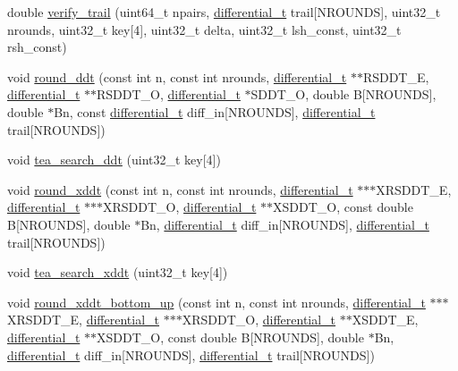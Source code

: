 \begin{DoxyCompactItemize}
\item 
double \hyperlink{tea-add-ddt-search_8cc_ac37bdb6b6b92aab26ba068877b6591e4}{verify\-\_\-trail} (uint64\-\_\-t npairs, \hyperlink{structdifferential__t}{differential\-\_\-t} trail\mbox{[}\-N\-R\-O\-U\-N\-D\-S\mbox{]}, uint32\-\_\-t nrounds, uint32\-\_\-t key\mbox{[}4\mbox{]}, uint32\-\_\-t delta, uint32\-\_\-t lsh\-\_\-const, uint32\-\_\-t rsh\-\_\-const)
\item 
void \hyperlink{tea-add-ddt-search_8cc_a06a1cdac8a817642490ecdb7371de378}{round\-\_\-ddt} (const int n, const int nrounds, \hyperlink{structdifferential__t}{differential\-\_\-t} $\ast$$\ast$\-R\-S\-D\-D\-T\-\_\-\-E, \hyperlink{structdifferential__t}{differential\-\_\-t} $\ast$$\ast$\-R\-S\-D\-D\-T\-\_\-\-O, \hyperlink{structdifferential__t}{differential\-\_\-t} $\ast$\-S\-D\-D\-T\-\_\-\-O, double \-B\mbox{[}\-N\-R\-O\-U\-N\-D\-S\mbox{]}, double $\ast$\-Bn, const \hyperlink{structdifferential__t}{differential\-\_\-t} diff\-\_\-in\mbox{[}\-N\-R\-O\-U\-N\-D\-S\mbox{]}, \hyperlink{structdifferential__t}{differential\-\_\-t} trail\mbox{[}\-N\-R\-O\-U\-N\-D\-S\mbox{]})
\item 
void \hyperlink{tea-add-ddt-search_8cc_a5519276063a08ee4fc0d2f580899b9c9}{tea\-\_\-search\-\_\-ddt} (uint32\-\_\-t key\mbox{[}4\mbox{]})
\item 
void \hyperlink{tea-add-ddt-search_8cc_a6421afe69f9ebf929f3f33acb75fd680}{round\-\_\-xddt} (const int n, const int nrounds, \hyperlink{structdifferential__t}{differential\-\_\-t} $\ast$$\ast$$\ast$\-X\-R\-S\-D\-D\-T\-\_\-\-E, \hyperlink{structdifferential__t}{differential\-\_\-t} $\ast$$\ast$$\ast$\-X\-R\-S\-D\-D\-T\-\_\-\-O, \hyperlink{structdifferential__t}{differential\-\_\-t} $\ast$$\ast$\-X\-S\-D\-D\-T\-\_\-\-O, const double \-B\mbox{[}\-N\-R\-O\-U\-N\-D\-S\mbox{]}, double $\ast$\-Bn, \hyperlink{structdifferential__t}{differential\-\_\-t} diff\-\_\-in\mbox{[}\-N\-R\-O\-U\-N\-D\-S\mbox{]}, \hyperlink{structdifferential__t}{differential\-\_\-t} trail\mbox{[}\-N\-R\-O\-U\-N\-D\-S\mbox{]})
\item 
void \hyperlink{tea-add-ddt-search_8cc_adeb95c6bad2674864ec015054f307247}{tea\-\_\-search\-\_\-xddt} (uint32\-\_\-t key\mbox{[}4\mbox{]})
\item 
void \hyperlink{tea-add-ddt-search_8cc_ae2fedba8b096ccade5bd0e53baa5a14a}{round\-\_\-xddt\-\_\-bottom\-\_\-up} (const int n, const int nrounds, \hyperlink{structdifferential__t}{differential\-\_\-t} $\ast$$\ast$$\ast$\-X\-R\-S\-D\-D\-T\-\_\-\-E, \hyperlink{structdifferential__t}{differential\-\_\-t} $\ast$$\ast$$\ast$\-X\-R\-S\-D\-D\-T\-\_\-\-O, \hyperlink{structdifferential__t}{differential\-\_\-t} $\ast$$\ast$\-X\-S\-D\-D\-T\-\_\-\-E, \hyperlink{structdifferential__t}{differential\-\_\-t} $\ast$$\ast$\-X\-S\-D\-D\-T\-\_\-\-O, const double \-B\mbox{[}\-N\-R\-O\-U\-N\-D\-S\mbox{]}, double $\ast$\-Bn, \hyperlink{structdifferential__t}{differential\-\_\-t} diff\-\_\-in\mbox{[}\-N\-R\-O\-U\-N\-D\-S\mbox{]}, \hyperlink{structdifferential__t}{differential\-\_\-t} trail\mbox{[}\-N\-R\-O\-U\-N\-D\-S\mbox{]})
$$
\end{DoxyCompactItemize}
